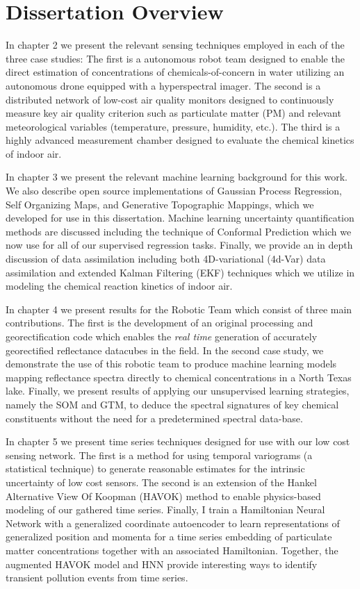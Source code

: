 \section{Dissertation Overview}

In chapter 2 we present the relevant sensing techniques employed in each of the three case studies: The first is a autonomous robot team designed to enable the direct estimation of concentrations of chemicals-of-concern in water utilizing an autonomous drone equipped with a hyperspectral imager. The second is a distributed network of low-cost air quality monitors designed to continuously measure key air quality criterion such as particulate matter (PM) and relevant meteorological variables (temperature, pressure, humidity, etc.). The third is a highly advanced measurement chamber designed to evaluate the chemical kinetics of indoor air.

In chapter 3 we present the relevant machine learning background for this work. We also describe open source implementations of Gaussian Process Regression, Self Organizing Maps, and Generative Topographic Mappings, which we developed for use in this dissertation. Machine learning uncertainty quantification methods are discussed including the technique of Conformal Prediction which we now use for all of our supervised regression tasks. Finally, we provide an in depth discussion of data assimilation including both 4D-variational (4d-Var) data assimilation and extended Kalman Filtering (EKF) techniques which we utilize in modeling the chemical reaction kinetics of indoor air.

In chapter 4 we present results for the Robotic Team which consist of three main contributions. The first is the development of an original processing and georectification code which enables the \textit{real time} generation of accurately georectified reflectance datacubes in the field. In the second case study, we demonstrate the use of this robotic team to produce machine learning models mapping reflectance spectra directly to chemical concentrations in a North Texas lake. Finally, we present results of applying our unsupervised learning strategies, namely the SOM and GTM, to deduce the spectral signatures of key chemical constituents without the need for a predetermined spectral data-base.

In chapter 5 we present time series techniques designed for use with our low cost sensing network. The first is a method for using temporal variograms (a statistical technique) to generate reasonable estimates for the intrinsic uncertainty of low cost sensors. The second is an extension of the Hankel Alternative View Of Koopman (HAVOK) method to enable physics-based modeling of our gathered time series. Finally, I train a Hamiltonian Neural Network with a generalized coordinate autoencoder to learn representations of generalized position and momenta for a time series embedding of particulate matter concentrations together with an associated Hamiltonian. Together, the augmented HAVOK model and HNN provide interesting ways to identify transient pollution events from time series.

